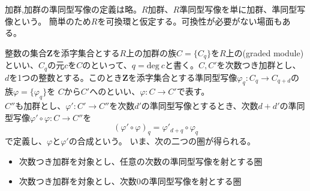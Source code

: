 \documentclass[dvipdfmx,a4paper,11pt]{jsarticle}
\begin{document}
加群,加群の準同型写像の定義は略。$R$加群、$R$準同型写像を単に加群、準同型写像という。
簡単のため$R$を可換環と仮定する。可換性が必要がない場面もある。
\begin{tcolorbox}[title = 例2]
  整数の集合$\mathbf{Z}$を添字集合とする$R$上の加群の族$C=\{C_{q}\}$を$R$上の(graded module)
  といい、$C_{q}$の元$c$を$C$のといって、$q=\text{deg}\ c$と書く。$C,C'$を次数つき加群とし、
  $d$を1つの整数とする。このとき$\mathbf{Z}$を添字集合とする準同型写像$\varphi_{q}:C_{q} \to C_{q+d}$の族$\varphi = \{\varphi_{q}\}$を
  $C$から$C'$へのといい、$\varphi : C\to C'$で表す。\\
  $C''$も加群とし、$\varphi' : C'\to C''$を次数$d'$の準同型写像とするとき、次数$d+d'$の準同型写像$\varphi' \circ \varphi : C\to C''$を
  \begin{equation*}
    (\varphi' \circ \varphi)_{q} = \varphi'_{d+q} \circ \varphi_{q}
  \end{equation*} 
  で定義し、$\varphi$と$\varphi'$の合成という。
  いま、次の二つの圏が得られる。
  \begin{itemize}
    \item 次数つき加群を対象とし、任意の次数の準同型写像を射とする圏
    \item 次数つき加群を対象とし、次数$0$の準同型写像を射とする圏
  \end{itemize}
\end{tcolorbox}
\end{document}
